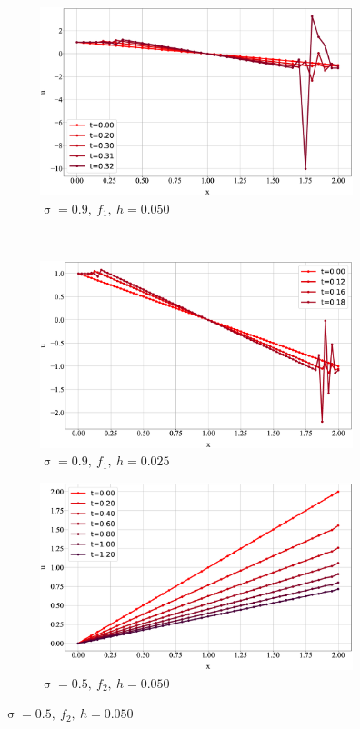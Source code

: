 \documentclass[a4paper,12pt]{article}
\DeclareMathOperator{\cour}{\sigma}
\begin{document}
\begin{figure}[p]
    \begin{subfigure}[t]{0.5\textwidth}
      \caption*{$\cour = 0.9,\ f_1,\ h = 0.050$}
      \includegraphics[width=\linewidth]{5.maccormack.cour09.f1050}
    \end{subfigure}
    ~
    \begin{subfigure}[t]{0.5\textwidth}
      \caption*{$\cour = 0.9,\ f_1,\ h = 0.025$}
      \includegraphics[width=\linewidth]{5.maccormack.cour09.f1025}
    \end{subfigure}
    \begin{subfigure}[t]{0.5\textwidth}
      \caption*{$\cour = 0.5,\ f_2,\ h = 0.050$}
      \includegraphics[width=\linewidth]{5.maccormack.cour05.f2050}

\end{subfigure}
\end{figure}
\end{document}
